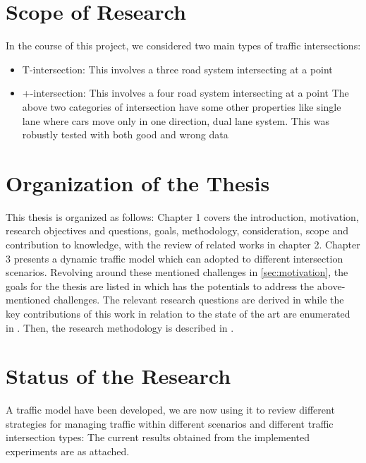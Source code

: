\documentclass{book}
\begin{document}
\section{Scope of Research}
\label{scope}
In the course of this project, we considered two main types of traffic intersections:
\begin{itemize}
    \item T-intersection: This involves a three road system intersecting at a point
    \item +-intersection:  This involves a four road system intersecting at a point
The above two categories of intersection have some other properties like single lane where cars move only in one direction, dual lane system.
This was robustly tested with both good and wrong data
\end{itemize}



\section{Organization of the Thesis}
\label{sec:organization}
This thesis is organized as follows: Chapter 1 covers the introduction, motivation, research objectives and questions, goals, methodology, consideration, scope and contribution to knowledge,  with the review of related works in chapter 2. Chapter 3 presents a dynamic traffic model which can adopted to different intersection scenarios. Revolving around these mentioned challenges in \cref{sec:motivation}, the goals for the thesis are listed in  which has the  potentials to address the above-mentioned challenges. The relevant research questions are derived in  while the key contributions of this work in relation to the state of the art are enumerated in . Then, the research methodology is described in .

\section{Status of the Research}
\label{sec:researchstatus}
A traffic model have been developed, we are now using it to review different strategies for managing traffic within different scenarios and different traffic intersection types: The current results obtained from the implemented experiments are as attached.
\end{document}
